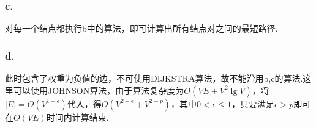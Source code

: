 \documentclass[twocolumn]{article}
\newenvironment{SChinese}{%
	\CJKfamily{gbsn}%
	\CJKtilde
	\CJKnospace}{}
\begin{document}
\begin{CJK}{UTF8}{}
\begin{SChinese}
			\subsubsection*{c.}
				对每一个结点都执行b中的算法，即可计算出所有结点对之间的最短路径.
			\subsubsection*{d.}
				此时包含了权重为负值的边，不可使用DIJKSTRA算法，故不能沿用b,c的算法.这里可以使用JOHNSON算法，由于算法复杂度为$O(VE+V^2\lg V)$，将$|E|=\varTheta(V^{1+\epsilon})$代入，得$O(V^{2+\epsilon}+V^{2+p})$，其中$0<\epsilon\le1$，只要满足$\epsilon > p$即可在$O(VE)$时间内计算结束.
\end{SChinese}
	\end{CJK}
\end{document}
